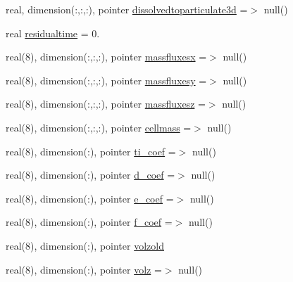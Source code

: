 \begin{DoxyCompactItemize}
\item 
real, dimension(\+:,\+:,\+:), pointer \mbox{\hyperlink{structmodulesedimentproperties_1_1t__sedimentproperties_ae7115322d0cd33a08a9fe80a8b6b7a78}{dissolvedtoparticulate3d}} =$>$ null()
\item 
real \mbox{\hyperlink{structmodulesedimentproperties_1_1t__sedimentproperties_a88bf52b1caae2ce3c4335cb25f26fbb8}{residualtime}} = 0.
\item 
real(8), dimension(\+:,\+:,\+:), pointer \mbox{\hyperlink{structmodulesedimentproperties_1_1t__sedimentproperties_a13d69f085e3c81988b9bc7ddca59b636}{massfluxesx}} =$>$ null()
\item 
real(8), dimension(\+:,\+:,\+:), pointer \mbox{\hyperlink{structmodulesedimentproperties_1_1t__sedimentproperties_ab431f4379529d5ff5a789931615ac9c5}{massfluxesy}} =$>$ null()
\item 
real(8), dimension(\+:,\+:,\+:), pointer \mbox{\hyperlink{structmodulesedimentproperties_1_1t__sedimentproperties_adf290abbc67c3c5e4ee55a9f48ae5b30}{massfluxesz}} =$>$ null()
\item 
real(8), dimension(\+:,\+:,\+:), pointer \mbox{\hyperlink{structmodulesedimentproperties_1_1t__sedimentproperties_ae72f10544966aa3cf81b7e80a94e813e}{cellmass}} =$>$ null()
\item 
real(8), dimension(\+:), pointer \mbox{\hyperlink{structmodulesedimentproperties_1_1t__sedimentproperties_a1d36bfe39aee30b867a4945142397726}{ti\+\_\+coef}} =$>$ null()
\item 
real(8), dimension(\+:), pointer \mbox{\hyperlink{structmodulesedimentproperties_1_1t__sedimentproperties_ac36f32c2b4471aff404be2bffab25966}{d\+\_\+coef}} =$>$ null()
\item 
real(8), dimension(\+:), pointer \mbox{\hyperlink{structmodulesedimentproperties_1_1t__sedimentproperties_a4dd221aaebd705f1178e18f705b04dba}{e\+\_\+coef}} =$>$ null()
\item 
real(8), dimension(\+:), pointer \mbox{\hyperlink{structmodulesedimentproperties_1_1t__sedimentproperties_a7397352009754128914fa257a0da03ed}{f\+\_\+coef}} =$>$ null()
\item 
real(8), dimension(\+:), pointer \mbox{\hyperlink{structmodulesedimentproperties_1_1t__sedimentproperties_a5065ed982344d330e43237d9e15e303f}{volzold}}
\item 
real(8), dimension(\+:), pointer \mbox{\hyperlink{structmodulesedimentproperties_1_1t__sedimentproperties_aece10a2e4985cd946f40d47f4755e6a0}{volz}} =$>$ null()
\item 

\end{DoxyCompactItemize}
